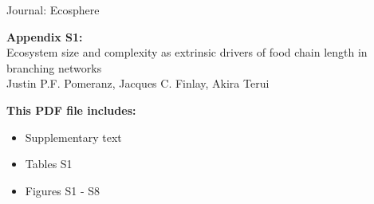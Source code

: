 \begin{flushleft}
\vspace*{5mm}
\LARGE{Journal: Ecosphere}\\[7.5mm]
\end{flushleft}
\LARGE{\textbf{Appendix S1:}}\\[4mm]
\LARGE{Ecosystem size and complexity as extrinsic drivers of food chain length in branching networks}\\[7.5mm]
\large{Justin P.F. Pomeranz, Jacques C. Finlay, Akira Terui}\\[7.5mm]
\begin{flushleft}
\textbf{This PDF file includes:}
\begin{itemize}
\item Supplementary text
\item Tables S1
\item Figures S1 - S8
\end{itemize}
\end{flushleft}

\newpage